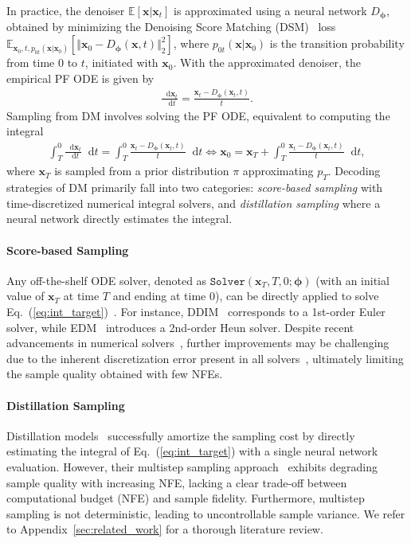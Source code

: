 \documentclass{article} \usepackage{iclr2024_coNFErence,times}
\def\eqref#1{equation~\ref{#1}}
\def\eqref#1{(\ref{#1})}
\def\eqref#1{(\ref{#1})}
\theoremstyle{definition}
\theoremstyle{remark}
\newcommand*\diff{\mathop{}\!\mathrm{d}}
\begin{document}
In practice, the denoiser $\mathbb{E}[\mathbf{x}\vert\mathbf{x}_{t}]$ is approximated using a neural network $D_{\bm{\phi}}$, obtained by minimizing the Denoising Score Matching (DSM)~\citep{vincent2011connection, song2020score} loss 
$\mathbb{E}_{\mathbf{x}_{0},t,p_{0t}(\mathbf{x}\vert\mathbf{x}_{0})}[\Vert \mathbf{x}_{0}-D_{\bm{\phi}}(\mathbf{x},t) \Vert_{2}^{2}]$, where $p_{0t}(\mathbf{x}\vert\mathbf{x}_{0})$ is the transition probability from time $0$ to $t$, initiated with $\mathbf{x}_{0}$. With the approximated denoiser, the empirical PF ODE is given by
\begin{align*}
    \frac{\diff \mathbf{x}_{t}}{\diff {t}} =\frac{\mathbf{x}_{{t}}-D_{\bm{\phi}}(\mathbf{x}_{t},{t}) }{{t}}.
\end{align*}
Sampling from DM involves solving the PF ODE, equivalent to computing the integral
\begin{align}\label{eq:int_target}
    \int_{T}^{0}\frac{\diff\mathbf{x}_{t}}{\diff t}\diff t=\int_{T}^{0}\frac{\mathbf{x}_{{t}}-D_{\bm{\phi}}(\mathbf{x}_{t},{t}) }{{t}}\diff t\iff \mathbf{x}_{0}=\mathbf{x}_{T}+\int_{T}^{0}\frac{\mathbf{x}_{{t}}-D_{\bm{\phi}}(\mathbf{x}_{t},{t}) }{{t}}\diff t,
\end{align}
where $\mathbf{x}_{T}$ is sampled from a prior distribution $\pi$ approximating $p_T$. 
Decoding strategies of DM primarily fall into two categories: \emph{score-based sampling} with time-discretized numerical integral solvers, and \emph{distillation sampling} where a neural network directly estimates the integral.


\paragraph{Score-based Sampling}
Any off-the-shelf ODE solver, denoted as $\texttt{Solver}(\mathbf{x}_{T},T,0;\bm{\phi})$ (with an initial value of $\mathbf{x}_T$ at time $T$ and ending at time $0$), can be directly applied to solve Eq.~\eqref{eq:int_target}~\citep{song2020score}. For instance, DDIM~\citep{song2020denoising} corresponds to a 1st-order Euler solver, while EDM~\citep{karras2022elucidating} introduces a 2nd-order Heun solver. Despite recent advancements in numerical solvers~\citep{lu2022dpm, zhang2022fast}, further improvements may be challenging due to the inherent discretization error present in all solvers~\citep{de2021diffusion}, ultimately limiting the sample quality obtained with few NFEs.

\paragraph{Distillation Sampling}
Distillation models~\citep{salimans2021progressive,meng2023distillation} successfully amortize the sampling cost by directly estimating the integral of Eq.~\eqref{eq:int_target} with a single neural network evaluation. However, their multistep sampling approach~\citep{song2023consistency} exhibits degrading sample quality with increasing NFE, lacking a clear trade-off between computational budget (NFE) and sample fidelity. Furthermore, multistep sampling is not deterministic, leading to uncontrollable sample variance.
We refer to Appendix~\ref{sec:related_work} for a thorough literature review.
\end{document}
